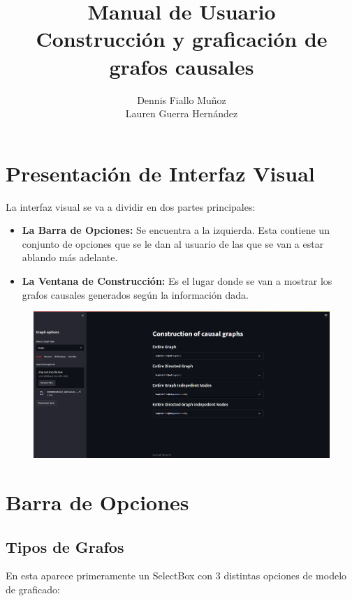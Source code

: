 \documentclass[spanish]{article}
\title{Manual de Usuario\\
    \large Construcción y graficación de grafos causales}
\author{ Dennis Fiallo Muñoz \\ Lauren Guerra Hernández}
\date{}
\begin{document}
\maketitle

\section*{Presentación de Interfaz Visual}

La interfaz visual se va a dividir en dos partes principales:
\begin{itemize}
    \item \textbf{La Barra de Opciones:} Se encuentra a la izquierda. Esta contiene un conjunto de opciones que se le dan al usuario de las que se van a estar ablando más adelante.
    \item \textbf{La Ventana de Construcción:} Es el lugar donde se van a mostrar los grafos causales generados según la información dada.
\end{itemize}

\begin{figure}[H]
    \includegraphics[scale=0.26]{visual.png}
\end{figure}	


\section*{Barra de Opciones}

\subsection*{Tipos de Grafos}
En esta aparece primeramente un SelectBox con 3 distintas opciones de modelo de graficado:
\end{document}
